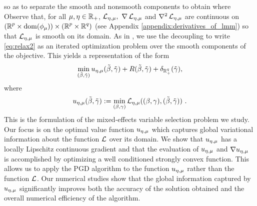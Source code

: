 so as to separate the smooth and nonsmooth components to obtain
where 
Observe that, for all $\mu,\eta\in\operatorname{\mathbb{R}}_+$, $\operatorname{\mathcal{L}}_{{\eta,\mu}},\ \nabla \operatorname{\mathcal{L}}_{{\eta,\mu}}$ and $\nabla^2 \operatorname{\mathcal{L}}_{{\eta,\mu}}$ are continuous
on $({\operatorname{\mathbb{R}}^p}\times\operatorname{\mathrm{dom}}(\phi_\mu))\times({\operatorname{\mathbb{R}}^p}\times{\operatorname{\mathbb{R}}^q})$ 
(see Appendix \ref{appendix:derivatives_of_lmm}) 
so that $\operatorname{\mathcal{L}}_{{\eta,\mu}}$ is smooth on its domain.
As in \cite{Zheng2019SR3}, we use the 
decoupling to write \eqref{eq:relax2}
as an iterated optimization problem over the smooth components of the objective.
This yields a representation of the form
\begin{equation}
    \label{eq:relax3}
    \min_{(\tilde\beta,{\tilde{\gamma}})} {u_{\eta,\mu}}(\tilde\beta,{\tilde{\gamma}}) + R(\tilde\beta,{\tilde{\gamma}})+\delta_{\operatorname{\mathbb{R}}^q_+}({\tilde{\gamma}}),
\end{equation}
where %
\begin{equation}
    \label{eq:value_function_definition}
    {u_{\eta,\mu}}(\tilde\beta,{\tilde{\gamma}}) := \min_{(\beta,\gamma) } 
    \operatorname{\mathcal{L}}_{{\eta,\mu}}((\beta,\gamma), (\tilde\beta,{\tilde{\gamma}}))\ .
\end{equation}
This is the formulation of the mixed-effects variable selection problem we study.
Our focus is on the optimal value function ${u_{\eta,\mu}}$ which captures global 
variational information about the function $\operatorname{\mathcal{L}}$ over its domain.
We show that ${u_{\eta,\mu}}$ has a locally Lipschitz continuous gradient
and that the evaluation of ${u_{\eta,\mu}}$ and $\nabla {u_{\eta,\mu}}$ is accomplished
by optimizing a well conditioned strongly convex function. This
allows us to apply the PGD algorithm to the function ${u_{\eta,\mu}}$ rather than
the function $\operatorname{\mathcal{L}}$. Our numerical studies show that the global information 
captured by ${u_{\eta,\mu}}$ significantly improves both the accuracy of the solution
obtained and the overall numerical efficiency of the algorithm.

